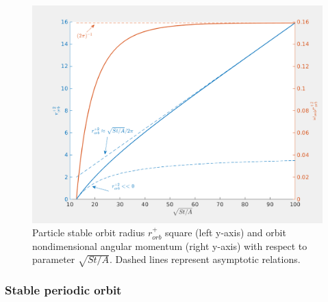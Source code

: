 \documentclass[../main.tex]{subfiles}
\begin{document}
\begin{figure}
\centering
\noindent \includegraphics[width=30pc]{gfx/r0_2_sqrt_St_A_omega_r0_2.png}
\caption{Particle stable orbit radius $r^+_{orb}$ square (left y-axis) and orbit nondimensional angular momentum (right y-axis) with respect to parameter $\sqrt{St/A}$. Dashed lines represent asymptotic relations.}
\label{fig:ch3_3}
\end{figure}

\subsubsection{Stable periodic orbit}
\end{document}
